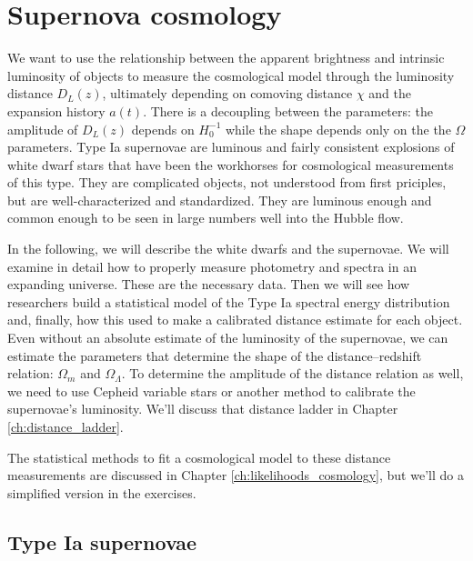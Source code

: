 \chapter{Supernova cosmology} \label{ch:standard_candles}

We want to use the relationship between the apparent brightness and intrinsic luminosity of objects to measure the cosmological model through the luminosity distance $D_L(z)$, ultimately depending on comoving distance $\chi$ and the expansion history $a(t)$.  There is a decoupling between the parameters: the amplitude of $D_L(z)$ depends on $H_0^{-1}$ while the shape depends only on the the $\Omega$ parameters.  Type Ia supernovae are luminous and fairly consistent explosions of white dwarf stars that have been the workhorses for cosmological measurements of this type.  They are complicated objects, not understood from first priciples, but are well-characterized and standardized.  They are luminous enough and common enough to be seen in large numbers well into the Hubble flow.  

In the following, we will describe the white dwarfs and the supernovae.
We will examine in detail how to properly measure  photometry and spectra in an expanding universe.  These are the necessary data.  Then we will see how researchers build a statistical model of the Type Ia spectral energy distribution and, finally, how this used to make a calibrated distance estimate for each object.  Even without an absolute estimate of the luminosity of the supernovae, we can estimate the parameters that determine the shape of the distance--redshift relation: $\Omega_m$ and $\Omega_\Lambda$.  To determine the amplitude of the distance relation as well, we need to use Cepheid variable stars or another method to calibrate the supernovae's luminosity.  We'll discuss that distance ladder in Chapter \ref{ch:distance_ladder}.

The statistical methods to fit a cosmological model to these distance measurements are discussed in Chapter \ref{ch:likelihoods_cosmology}, but we'll do a simplified version in the exercises.




\section{Type Ia supernovae} %

